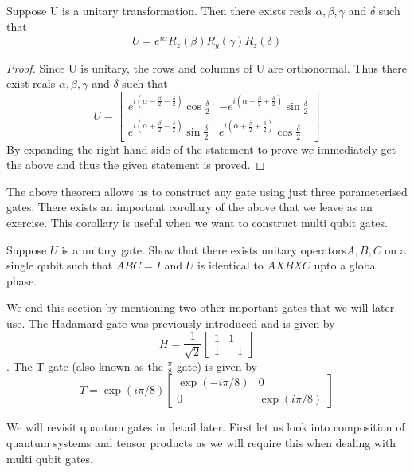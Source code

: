 \begin{theorem}
Suppose U is a unitary transformation. Then there exists reals $\alpha, \beta, \gamma$ and $\delta$ such that 
$$ U = e^{i\alpha}R_z(\beta)R_y(\gamma)R_z(\delta)$$
\end{theorem}

\begin{proof}
Since U is unitary, the rows and columns of U are orthonormal. Thus there exist reals $\alpha, \beta, \gamma$ and $\delta$ such that 
$$U = \begin{bmatrix}e^{i(\alpha - \frac{\beta}{2} - \frac{\delta}{2})}\cos{\frac{\delta}{2}} & -e^{i(\alpha - \frac{\beta}{2} + \frac{\delta}{2})}\sin{\frac{\delta}{2}} \\e^{i(\alpha + \frac{\beta}{2} - \frac{\delta}{2})}\sin{\frac{\delta}{2}}& e^{i(\alpha + \frac{\beta}{2} + \frac{\delta}{2})}\cos{\frac{\delta}{2}}
\end{bmatrix}
$$
By expanding the right hand side of the statement to prove we immediately get the above and thus the given statement is proved.
\end{proof}

The above theorem allows us to construct any gate using just three parameterised gates. There exists an important corollary of the above that we leave as an exercise. This corollary is useful when we want to construct multi qubit gates.

\begin{exercise}
Suppose $U$ is a unitary gate. Show that there exists unitary operators$A, B, C$ on a single qubit such that $ABC=I$ and $U$ is identical to $AXBXC$ upto a global phase.
\end{exercise}

We end this section by mentioning two other important gates that we will later use.
The Hadamard gate was previously introduced and is given by 
$$H = \frac{1}{\sqrt{2}}\begin{bmatrix}1 & 1 \\ 1&-1 \end{bmatrix} $$.
The T gate (also known as the $\frac{\pi}{8}$ gate) is given by 
$$ T = \exp(i\pi/8)\begin{bmatrix} \exp(-i\pi/8) & 0 \\ 0 & \exp(i\pi/8) \end{bmatrix}$$

We will revisit quantum gates in detail later. First let us look into composition of quantum systems and tensor products as we will require this when dealing with multi qubit gates.

\clearpage